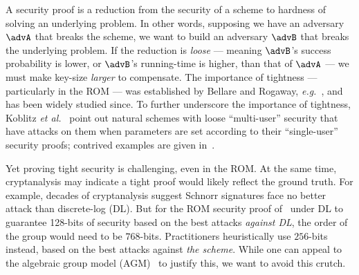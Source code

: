  A security proof is  a reduction from the security of a scheme to hardness of solving an underlying  problem.  In other words, supposing we have an adversary $\advA$ that breaks the scheme, we want to build an adversary $\advB$ that breaks the underlying problem. If the reduction is \emph{loose} --- meaning $\advB$'s success probability is lower, or $\advB$'s running-time is higher, than that of $\advA$ ---  we must make key-size \emph{larger} to compensate. The importance of tightness --- particularly in the ROM --- was  established by Bellare and Rogaway,  \emph{e.g.}~\cite{CCS:BelRog93,EC:BelRog94,EC:BelRog96}, and has been widely studied since.  To further underscore the importance of tightness, Koblitz \emph{et al.}~\cite{SAC:ChaMenSar11} point out natural  schemes with loose ``multi-user'' security that have attacks on them when   parameters are  set according to their ``single-user'' security proofs; contrived examples are given in~\cite{EC:BelBolMic00}.



Yet proving tight security is  challenging, even in the ROM. At the same time,  cryptanalysis may indicate   a tight  proof would likely reflect the ground truth. For example, decades of cryptanalysis suggest Schnorr signatures face no better attack than discrete-log (DL).
But for the  ROM security proof of~\cite{EC:PoiSte96} under DL to guarantee 128-bits of security based on the best attacks \emph{against DL}, the order of the group would  need to be $768$-bits.  Practitioners  heuristically use $256$-bits instead, based on the best attacks against \emph{the scheme}.
While one can appeal to the algebraic group model (AGM)~\cite{C:FucKilLos18,EC:FucPloSeu20} to justify this, we want to avoid this crutch. 


